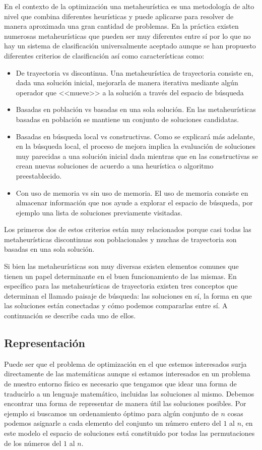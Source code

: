 En el contexto de la optimización una metaheurística es una metodología de alto nivel que combina diferentes heurísticas y puede aplicarse para resolver de manera aproximada una gran cantidad de problemas. En la práctica existen numerosas metaheurísticas que pueden ser muy diferentes entre sí por lo que no hay un sistema de clasificación universalmente aceptado aunque se han propuesto diferentes criterios de clasificación \cite{Stegherr2020} así como características como:
\begin{itemize}
\item De trayectoria vs discontinua. Una metaheurística de trayectoria consiste en, dada una solución inicial, mejorarla de manera iterativa mediante algún operador que <<mueve>> a la solución a través del espacio de búsqueda %
\item Basadas en población vs basadas en una sola solución. En las metaheurísticas basadas en población se mantiene un conjunto de soluciones candidatas.
\item Basadas en búsqueda local vs constructivas. Como se explicará más adelante, en la búsqueda local, el proceso de mejora implica la evaluación de soluciones muy parecidas a una solución inicial dada mientras que en las constructivas se crean nuevas soluciones de acuerdo a una heurística o algoritmo preestablecido.
\item Con uso de memoria vs sin uso de memoria. El uso de memoria consiste en almacenar información que nos ayude a explorar el espacio de búsqueda, por ejemplo una lista de soluciones previamente visitadas.
\end{itemize} 
Los primeros dos de estos criterios están muy relacionados porque casi todas las metaheurísticas discontinuas son poblacionales y muchas de trayectoria son basadas en una sola solución.


Si bien las metaheurísticas son muy diversas existen elementos comunes que tienen un papel determinante en el buen funcionamiento de las mismas. En específico para las metaheurísticas de trayectoria existen tres conceptos que determinan el llamado paisaje de búsqueda: las soluciones en sí, la forma en que las soluciones están conectadas y cómo podemos compararlas entre sí. A continuación se describe cada uno de ellos.
\subsection{Representación}
Puede ser que el problema de optimización en el que estemos interesados surja directamente de las matemáticas aunque si estamos interesados en un problema de nuestro entorno físico es necesario que tengamos que idear una forma de traducirlo a un lenguaje matemático, incluidas las soluciones al mismo. Debemos encontrar una forma de representar de manera útil las soluciones posibles.
Por ejemplo si buscamos un ordenamiento óptimo para algún conjunto de $n$ cosas podemos asignarle a cada elemento del conjunto un número entero del $1$ al $n$, en este modelo el espacio de soluciones está constituido por todas las permutaciones de los números del $1$ al $n$. 

